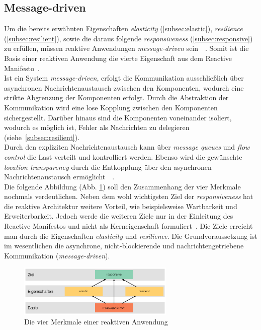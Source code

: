 \subsection{Message-driven}\label{subsec:messagedriven}
Um die bereits erwähnten Eigenschaften \textit{elasticity} (\ref{subsec:elastic}), \textit{resilience} (\ref{subsec:resilient}), sowie die daraus folgende \textit{responsiveness} (\ref{subsec:responsive}) zu erfüllen, müssen reaktive Anwendungen \textit{message-driven} sein~\cite{webber_what_2014}~\cite[S.~43]{kuhn_reactive_2015}. Somit ist die Basis einer reaktiven Anwendung die vierte Eigenschaft aus dem Reactive Manifesto~\cite{boner_reactive_2014}.\\
Ist ein System \textit{message-driven}, erfolgt die Kommunikation ausschließlich über asynchronen Nachrichtenaustausch zwischen den Komponenten, wodurch eine strikte Abgrenzung der Komponenten erfolgt. Durch die Abstraktion der Kommunikation wird eine lose Kopplung zwischen den Komponenten sichergestellt. Darüber hinaus sind die Komponenten voneinander isoliert, wodurch es möglich ist, Fehler als Nachrichten zu delegieren (siehe~\ref{subsec:resilient}).\\
Durch den expliziten Nachrichtenaustausch kann über \textit{message queues} und \textit{flow control} die Last verteilt und kontrolliert werden. Ebenso wird die gewünschte \textit{location transparency} durch die Entkopplung über den asynchronen Nachrichtenaustausch ermöglicht~\cite{boner_reactive_2015}~\cite[S.~43]{kuhn_reactive_2015}.\\
Die folgende Abbildung (Abb. \ref{fig:four-traits}) soll den Zusammenhang der vier Merkmale nochmals verdeutlichen. Neben dem wohl wichtigsten Ziel der \textit{responsiveness} hat die reaktive Architektur weitere Vorteil, wie beispielsweise Wartbarkeit und Erweiterbarkeit. Jedoch werde die weiteren Ziele nur in der Einleitung des Reactive Manifestos und nicht als Kerneigenschaft formuliert~\cite{boner_reactive_2014}. Die Ziele erreicht man durch die Eigenschaften \textit{elasticity} und \textit{resilience}. Die Grundvoraussetzung ist im wesentlichen die asynchrone, nicht-blockierende und nachrichtengetriebene Kommunikation (\textit{message-driven}).

\begin{figure}[H]
 \centering
 \includegraphics[width=0.665\textwidth]{3-Grundlagen/four-traits/four-traits.eps}
 \caption{Die vier Merkmale einer reaktiven Anwendung \cite{kuhn_code_2015}}
 \label{fig:four-traits}
\end{figure}

